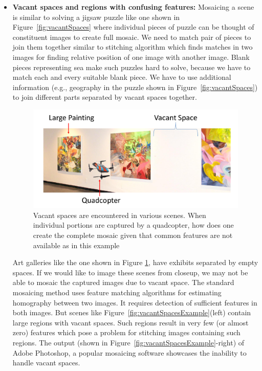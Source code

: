 \begin{itemize}
  \item \textbf{Vacant spaces and regions with confusing features:} 
  Mosaicing a scene is similar to solving a jigsaw puzzle like one shown in
  Figure~\ref{fig:vacantSpaces} where individual pieces of puzzle can be
  thought of constituent images to create full mosaic. We need to match pair of
  pieces to join them together similar to stitching algorithm which finds
  matches in two images for finding relative position of one image with another
  image. Blank pieces representing sea make such puzzles hard to solve, because
   we have to match each and every suitable blank piece. We have to use
   additional information (e.g., geography in the puzzle shown in
   Figure~\ref{fig:vacantSpaces}) to join different parts separated by vacant
   spaces together.
  
\begin{figure}[h!]
\centering
\includegraphics[width=0.98\linewidth]{figures/vacantSpaces/indoor}
\caption[Vacant spaces problem in art gallery]{Vacant spaces are encountered in
various scenes.
When individual portions are captured by a quadcopter, how does one create the complete mosaic
    given that common features are not available as in this example}
\label{fig:indoor}
\end{figure}
  
  Art galleries like the one shown in Figure \ref{fig:indoor}, have exhibits
  separated by empty spaces. If we would like to image these scenes from closeup, we may not
  be able to mosaic the captured images due to vacant space. The standard
  mosaicing method uses feature matching algorithms for estimating homography
  between two images. It requires detection of sufficient features in both
  images. But scenes like Figure~\ref{fig:vacantSpacesExample}(left) contain
  large regions with vacant spaces. Such regions result in very few (or almost
  zero) features which pose a problem for stitching images containing such regions.
  The output (shown in Figure~\ref{fig:vacantSpacesExample}-right) of Adobe
  Photoshop, a popular mosaicing software showcases the inability to
  handle vacant spaces.
  

\end{itemize}
